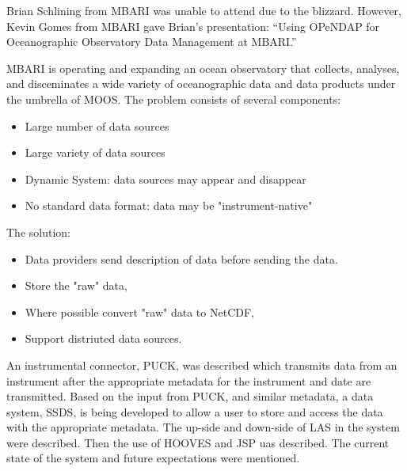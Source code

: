 Brian Schlining from \ac{MBARI} was unable to attend due to the blizzard.  
However, Kevin Gomes from \ac{MBARI} gave Brian's presentation: ``Using
OPeNDAP for Oceanographic Observatory Data Management at \ac{MBARI}.''

\ac{MBARI} is operating and expanding an ocean observatory that
collects, analyses, and disceminates a wide variety of oceanographic
data and data products under the umbrella of \ac{MOOS}.  The problem 
consists of several components:

\begin{itemize}
   \item  Large number of data sources
   \item  Large variety of data sources
   \item  Dynamic System:  data sources may appear and disappear
   \item  No standard data format:  data may be "instrument-native"
\end{itemize}

The solution:

\begin{itemize}
   \item Data providers send description of data before sending the data.
   \item Store the "raw" data,
   \item Where possible convert "raw" data to NetCDF,
   \item Support distriuted data sources.
\end{itemize}

An instrumental connector, \ac{PUCK}, was described which transmits data from
an instrument after the appropriate metadata for the instrument and date
are transmitted.  Based on the input from \ac{PUCK}, and similar
metadata, a data system, \ac{SSDS}, is being developed to allow a user to
store and access the data with the appropriate metadata.  The up-side
and down-side of  \ac{LAS} in the system were described.  Then the
use of HOOVES and \ac{JSP} uas described.   The current state of the
system and future expectations were mentioned. 

%
%
%
%

